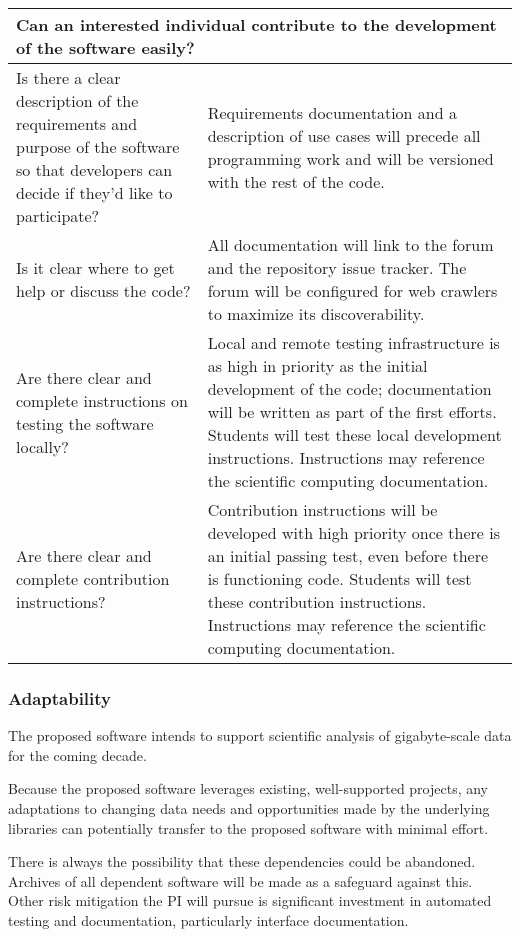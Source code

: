 \begin{tabularx}{\textwidth}{XX}
    \multicolumn{2}{l}{Can an interested individual contribute to the development of the software easily?}\\
\toprule

    Is there a clear description of the requirements and purpose of the software so that developers can decide if they'd like to participate?
    & Requirements documentation and a description of use cases will precede all programming work and will be versioned with the rest of the code.\\
    Is it clear where to get help or discuss the code?
    & All documentation will link to the forum and the repository issue tracker.  The forum will be configured for web crawlers to maximize its discoverability.\\
    Are there clear and complete instructions on testing the software locally?
    & Local and remote testing infrastructure is as high in priority as the initial development of the code; documentation will be written as part of the first efforts.  Students will test these local development instructions.  Instructions may reference the scientific computing documentation.\\
    Are there clear and complete contribution instructions?
    & Contribution instructions will be developed with high priority once there is an initial passing test, even before there is functioning code.  Students will test these contribution instructions.  Instructions may reference the scientific computing documentation.\\
    \bottomrule
\end{tabularx}


\subsubsection*{Adaptability}
The proposed software intends to support scientific analysis of gigabyte-scale data for the coming decade.

Because the proposed software leverages existing, well-supported projects, any adaptations to changing data needs and opportunities made by the underlying libraries can potentially transfer to the proposed software with minimal effort.

There is always the possibility that these dependencies could be abandoned.  Archives of all dependent software will be made as a safeguard against this.  Other risk mitigation the PI will pursue is significant investment in automated testing and documentation, particularly interface documentation.

